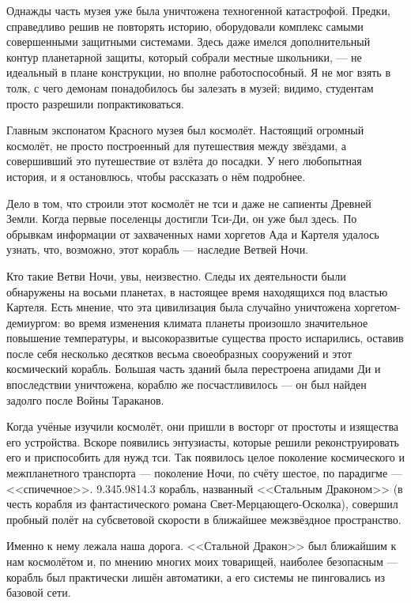 Однажды часть музея уже была уничтожена техногенной катастрофой.
Предки, справедливо решив не повторять историю, оборудовали комплекс самыми совершенными защитными системами.
Здесь даже имелся дополнительный контур планетарной защиты, который собрали местные школьники, --- не идеальный в плане конструкции, но вполне работоспособный.
Я не мог взять в толк, с чего демонам понадобилось бы залезать в музей;
видимо, студентам просто разрешили попрактиковаться.

Главным экспонатом Красного музея был космолёт.
Настоящий огромный космолёт, не просто построенный для путешествия между звёздами, а совершивший это путешествие от взлёта до посадки.
У него любопытная история, и я остановлюсь, чтобы рассказать о нём подробнее.

Дело в том, что строили этот космолёт не тси и даже не сапиенты Древней Земли.
Когда первые поселенцы достигли Тси-Ди, он уже был здесь.
По обрывкам информации от захваченных нами хоргетов Ада и Картеля удалось узнать, что, возможно, этот корабль --- наследие Ветвей Ночи.

Кто такие Ветви Ночи, увы, неизвестно.
Следы их деятельности были обнаружены на восьми планетах, в настоящее время находящихся под властью Картеля.
Есть мнение, что эта цивилизация была случайно уничтожена хоргетом-демиургом: во время изменения климата планеты произошло значительное повышение температуры, и высокоразвитые существа просто испарились, оставив после себя несколько десятков весьма своеобразных сооружений и этот космический корабль.
Большая часть зданий была перестроена апидами Ди и впоследствии уничтожена, кораблю же посчастливилось --- он был найден задолго после Войны Тараканов.

Когда учёные изучили космолёт, они пришли в восторг от простоты и изящества его устройства.
Вскоре появились энтузиасты, которые решили реконструировать его и приспособить для нужд тси.
Так появилось целое поколение космического и межпланетного транспорта --- поколение Ночи, по счёту шестое, по парадигме --- <<спичечное>>.
9.345.9814.3 корабль, названный <<Стальным Драконом>> (в честь корабля из фантастического романа Свет-Мерцающего-Осколка), совершил пробный полёт на субсветовой скорости в ближайшее межзвёздное пространство.

Именно к нему лежала наша дорога.
<<Стальной Дракон>> был ближайшим к нам космолётом и, по мнению многих моих товарищей, наиболее безопасным --- корабль был практически лишён автоматики, а его системы не пинговались из базовой сети.

